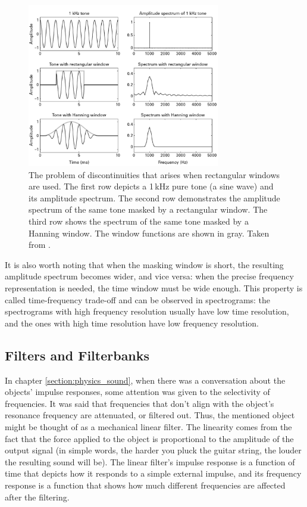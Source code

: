 \begin{figure}[t]
	\centering
	\includegraphics[width=0.75\textwidth]{include/windowing_example}
	\caption[An example of windowing and the problem of discontinuities]{The problem of discontinuities that arises when rectangular windows are used. The first row depicts a 1\,kHz pure tone (a sine wave) and its amplitude spectrum. The second row demonstrates the amplitude spectrum of the same tone masked by a rectangular window. The third row shows the spectrum of the same tone masked by a Hanning window. The window functions are shown in gray. Taken from \cite{Schnupp2011}.}
	\label{img:windowing_example}
\end{figure}

It is also worth noting that when the masking window is short, the resulting amplitude spectrum becomes wider, and vice versa: when the precise frequency representation is needed, the time window must be wide enough. This property is called time-frequency trade-off and can be observed in spectrograms: the spectrograms with high frequency resolution usually have low time resolution, and the ones with high time resolution have low frequency resolution.

\subsection{Filters and Filterbanks}\label{section:math_filters}

In chapter \ref{section:physics_sound}, when there was a conversation about the objects' impulse responses, some attention was given to the selectivity of frequencies. It was said that frequencies that don't align with the object's resonance frequency are attenuated, or filtered out. Thus, the mentioned object might be thought of as a mechanical linear filter. The linearity comes from the fact that the force applied to the object is proportional to the amplitude of the output signal (in simple words, the harder you pluck the guitar string, the louder the resulting sound will be). The linear filter's impulse response is a function of time that depicts how it responds to a simple external impulse, and its frequency response is a function that shows how much different frequencies are affected after the filtering.\\

